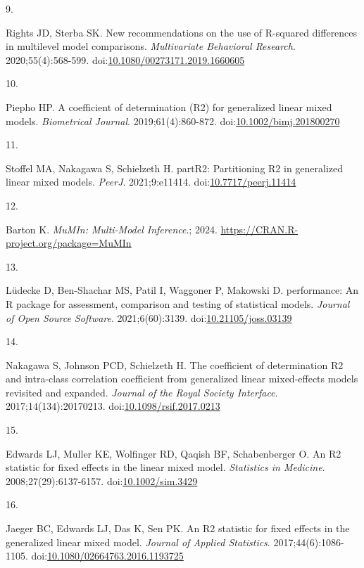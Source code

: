 \documentclass[
  11pt,
]{article}
\newlength{\cslhangindent}
\newlength{\csllabelwidth}
\newenvironment{CSLReferences}[2] %
 {\begin{list}{}{%
  \setlength{\itemindent}{0pt}
  \setlength{\leftmargin}{0pt}
  \setlength{\parsep}{0pt}
  \ifodd #1
   \setlength{\leftmargin}{\cslhangindent}
   \setlength{\itemindent}{-1\cslhangindent}
  \fi
  \setlength{\itemsep}{#2\baselineskip}}}
 {\end{list}}
\newcommand{\CSLLeftMargin}[1]{\parbox[t]{\csllabelwidth}{\strut#1\strut}}
\newcommand{\CSLRightInline}[1]{\parbox[t]{\linewidth - \csllabelwidth}{\strut#1\strut}}
\begin{document}
\begin{CSLReferences}{0}{1}
\CSLLeftMargin{9. }%
\CSLRightInline{Rights JD, Sterba SK. New recommendations on the use of {R}-squared differences in multilevel model comparisons. \emph{Multivariate Behavioral Research}. 2020;55(4):568-599. doi:\href{https://doi.org/10.1080/00273171.2019.1660605}{10.1080/00273171.2019.1660605}}

\CSLLeftMargin{10. }%
\CSLRightInline{Piepho HP. A coefficient of determination ({R2}) for generalized linear mixed models. \emph{Biometrical Journal}. 2019;61(4):860-872. doi:\href{https://doi.org/10.1002/bimj.201800270}{10.1002/bimj.201800270}}

\CSLLeftMargin{11. }%
\CSLRightInline{Stoffel MA, Nakagawa S, Schielzeth H. {partR2}: Partitioning {R2} in generalized linear mixed models. \emph{PeerJ}. 2021;9:e11414. doi:\href{https://doi.org/10.7717/peerj.11414}{10.7717/peerj.11414}}

\CSLLeftMargin{12. }%
\CSLRightInline{Barton K. \emph{{MuMIn}: Multi-Model Inference}.; 2024. \url{https://CRAN.R-project.org/package=MuMIn}}

\CSLLeftMargin{13. }%
\CSLRightInline{Lüdecke D, Ben-Shachar MS, Patil I, Waggoner P, Makowski D. {performance}: An {R} package for assessment, comparison and testing of statistical models. \emph{Journal of Open Source Software}. 2021;6(60):3139. doi:\href{https://doi.org/10.21105/joss.03139}{10.21105/joss.03139}}

\CSLLeftMargin{14. }%
\CSLRightInline{Nakagawa S, Johnson PCD, Schielzeth H. The coefficient of determination {R2} and intra-class correlation coefficient from generalized linear mixed-effects models revisited and expanded. \emph{Journal of the Royal Society Interface}. 2017;14(134):20170213. doi:\href{https://doi.org/10.1098/rsif.2017.0213}{10.1098/rsif.2017.0213}}

\CSLLeftMargin{15. }%
\CSLRightInline{Edwards LJ, Muller KE, Wolfinger RD, Qaqish BF, Schabenberger O. An {R2} statistic for fixed effects in the linear mixed model. \emph{Statistics in Medicine}. 2008;27(29):6137-6157. doi:\href{https://doi.org/10.1002/sim.3429}{10.1002/sim.3429}}

\CSLLeftMargin{16. }%
\CSLRightInline{Jaeger BC, Edwards LJ, Das K, Sen PK. An {R2} statistic for fixed effects in the generalized linear mixed model. \emph{Journal of Applied Statistics}. 2017;44(6):1086-1105. doi:\href{https://doi.org/10.1080/02664763.2016.1193725}{10.1080/02664763.2016.1193725}}


\end{CSLReferences}
\end{document}
